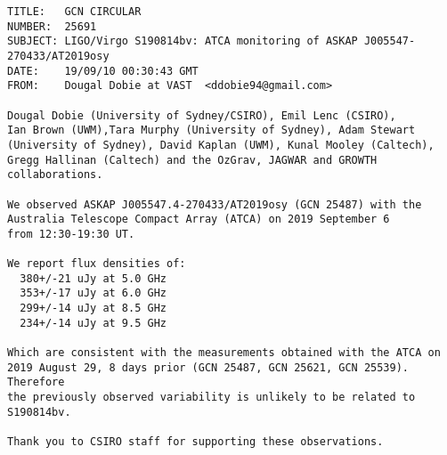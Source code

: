\pagebreak
{}
\begin{verbatim}
TITLE:   GCN CIRCULAR
NUMBER:  25691
SUBJECT: LIGO/Virgo S190814bv: ATCA monitoring of ASKAP J005547-270433/AT2019osy
DATE:    19/09/10 00:30:43 GMT
FROM:    Dougal Dobie at VAST  <ddobie94@gmail.com>

Dougal Dobie (University of Sydney/CSIRO), Emil Lenc (CSIRO),
Ian Brown (UWM),Tara Murphy (University of Sydney), Adam Stewart
(University of Sydney), David Kaplan (UWM), Kunal Mooley (Caltech),
Gregg Hallinan (Caltech) and the OzGrav, JAGWAR and GROWTH collaborations.

We observed ASKAP J005547.4-270433/AT2019osy (GCN 25487) with the
Australia Telescope Compact Array (ATCA) on 2019 September 6
from 12:30-19:30 UT.

We report flux densities of:
  380+/-21 uJy at 5.0 GHz
  353+/-17 uJy at 6.0 GHz
  299+/-14 uJy at 8.5 GHz
  234+/-14 uJy at 9.5 GHz

Which are consistent with the measurements obtained with the ATCA on
2019 August 29, 8 days prior (GCN 25487, GCN 25621, GCN 25539). Therefore
the previously observed variability is unlikely to be related to S190814bv.

Thank you to CSIRO staff for supporting these observations.
\end{verbatim}
\pagebreak
{}
